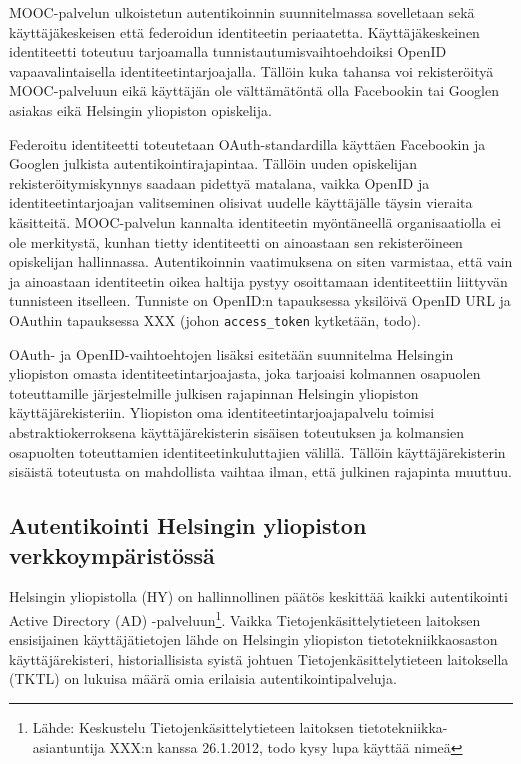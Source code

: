 \documentclass[finnish,gradu]{tktltiki}
\begin{document}
  MOOC-palvelun ulkoistetun autentikoinnin suunnitelmassa sovelletaan sekä käyttäjäkeskeisen että federoidun identiteetin periaatetta. Käyttäjäkeskeinen identiteetti toteutuu tarjoamalla tunnistautumisvaihtoehdoiksi OpenID vapaavalintaisella identiteetintarjoajalla. Tällöin kuka tahansa voi rekisteröityä MOOC-palveluun eikä käyttäjän ole välttämätöntä olla Facebookin tai Googlen asiakas eikä Helsingin yliopiston opiskelija.

  Federoitu identiteetti toteutetaan OAuth-standardilla käyttäen Facebookin ja Googlen julkista autentikointirajapintaa. Tällöin uuden opiskelijan rekisteröitymiskynnys saadaan pidettyä matalana, vaikka OpenID ja identiteetintarjoajan valitseminen olisivat uudelle käyttäjälle täysin vieraita käsitteitä. MOOC-palvelun kannalta identiteetin myöntäneellä organisaatiolla ei ole merkitystä, kunhan tietty identiteetti on ainoastaan sen rekisteröineen opiskelijan hallinnassa. Autentikoinnin vaatimuksena on siten varmistaa, että vain ja ainoastaan identiteetin oikea haltija pystyy osoittamaan identiteettiin liittyvän tunnisteen itselleen. Tunniste on OpenID:n tapauksessa yksilöivä OpenID URL ja OAuthin tapauksessa XXX (johon \verb#access_token# kytketään, todo).

  OAuth- ja OpenID-vaihtoehtojen lisäksi esitetään suunnitelma Helsingin yliopiston omasta identiteetintarjoajasta, joka tarjoaisi kolmannen osapuolen toteuttamille järjestelmille julkisen rajapinnan Helsingin yliopiston käyttäjärekisteriin. Yliopiston oma identiteetintarjoajapalvelu toimisi abstraktiokerroksena käyttäjärekisterin sisäisen toteutuksen ja kolmansien osapuolten toteuttamien identiteetinkuluttajien välillä. Tällöin käyttäjärekisterin sisäistä toteutusta on mahdollista vaihtaa ilman, että julkinen rajapinta muuttuu.



  \subsection{Autentikointi Helsingin yliopiston verkkoympäristössä} %
  \label{sub:autentikointi_helsingin_yliopiston_verkkoympäristössä}

  Helsingin yliopistolla (HY) on hallinnollinen päätös keskittää kaikki autentikointi Active Directory (AD) -palveluun\footnote{Lähde: Keskustelu Tietojenkäsittelytieteen laitoksen tietotekniikka-asiantuntija XXX:n kanssa 26.1.2012, todo kysy lupa käyttää nimeä}. Vaikka Tietojenkäsittelytieteen laitoksen ensisijainen käyttäjätietojen lähde on Helsingin yliopiston tietotekniikkaosaston käyttäjärekisteri, historiallisista syistä johtuen Tietojenkäsittelytieteen laitoksella (TKTL) on lukuisa määrä omia erilaisia autentikointipalveluja.
\end{document}
